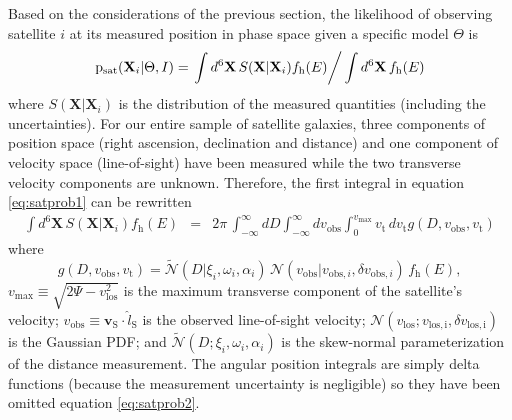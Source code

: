 \documentclass[preprint]{aastex}
\newcommand{\eqlabel}[1]{\label{eq:#1}}
\newcommand{\eq}[1]{equation \ref{eq:#1}}
\begin{document}
Based on the considerations of the previous section, the likelihood of observing
satellite $i$ at its measured position in phase space given a specific model $\Theta$ is
\begin{equation}
    \eqlabel{satprob1}
    \mathrm{p}_\mathrm{sat}(\mathbf{X}_i | \Theta,I) =
    \left . \int d^6 \mathbf{X} \, S(\mathbf{X} | \mathbf{X}_i) f_\mathrm{h} (E)
    \right /\int d^6 \mathbf{X} \, f_\mathrm{h} (E)
\end{equation}
where $S(\mathbf{X} | \mathbf{X}_i)$ is the distribution of the measured quantities
(including the uncertainties).  For our entire sample of satellite galaxies, three
components of position space (right ascension, declination and distance) and one
component of velocity space (line-of-sight) have been measured while the two
transverse velocity components are unknown.  Therefore, the first integral in
\eq{satprob1} can be rewritten
\begin{eqnarray}
    \eqlabel{satprob2}
    \int d^6 \mathbf{X} \, S(\mathbf{X} | \mathbf{X}_i) f_\mathrm{h} (E)
    & = & 2 \pi \, \int_{-\infty}^{\infty} dD \int_{-\infty}^{\infty} dv_\mathrm{obs}
    \int_0 ^{v_\mathrm{max}} v_{\mathrm{t}} \, dv_{\mathrm{t}}
    g(D,v_\mathrm{obs},v_\mathrm{t})
\end{eqnarray}
where
\begin{equation}
    g (D,v_\mathrm{obs},v_\mathrm{t})
    = \tilde{\mathcal{N}} (D | \xi_i, \omega_i, \alpha_i) \,
    \mathcal{N} (v_\mathrm{obs} | v_{\mathrm{obs},i},\delta v_{\mathrm{obs},i})\,
    f_\mathrm{h} (E)  ,
\end{equation}
$v_\mathrm{max} \equiv \sqrt{2 \Psi - v_\mathrm{los}^2}$ is the maximum transverse
component of the satellite's velocity;
$v_\mathrm{obs} \equiv \mathbf{v}_\mathrm{S} \cdot \hat{l}_\mathrm{S}$ is the
observed line-of-sight velocity;
$\mathcal{N} (v_\mathrm{los}; v_\mathrm{los,i},\delta v_\mathrm{los,i})$ is the
Gaussian PDF; and  $\tilde{\mathcal{N}} (D; \xi_i, \omega_i, \alpha_i)$ is the
skew-normal parameterization of the distance measurement.  The angular position
integrals are simply delta functions (because the measurement uncertainty is
negligible) so they have been omitted \eq{satprob2}.
\end{document}
